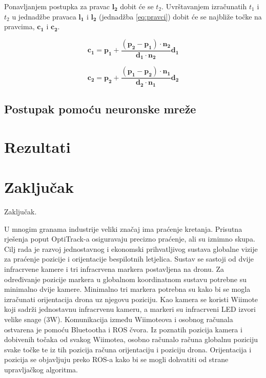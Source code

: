 \documentclass[times, utf8, diplomski]{fer}
\begin{document}
Ponavljanjem postupka za pravac $\bm{l_2}$ dobit će se $t_2$. Uvrštavanjem izračunatih $t_1$ i $t_2$ u jednadžbe pravaca $\bm{l_1}$ i $\bm{l_2}$ (jednadžba \ref{eq:pravci}) dobit će se najbliže točke na pravcima, $\bm{c_1}$ i $\bm{c_2}$.

\begin{equation}
\bm{c_1} = \bm{p_1} + \frac{(\bm{p_2} - \bm{p_1})\cdot \bm{n_2}}{\bm{d_1}\cdot\bm{n_2}}\bm{d_1}
\end{equation}

\begin{equation}
\bm{c_2} = \bm{p_2} + \frac{(\bm{p_1} - \bm{p_2})\cdot \bm{n_1}}{\bm{d_2}\cdot\bm{n_1}}\bm{d_2}
\end{equation}
 
\section{Postupak pomoću neuronske mreže}


\chapter{Rezultati}

\chapter{Zaključak}
Zaključak.




\begin{sazetak}
U mnogim granama industrije veliki značaj ima praćenje kretanja. Prisutna rješenja poput OptiTrack-a osiguravaju precizno praćenje, ali su iznimno skupa. Cilj rada je razvoj jednostavnog i ekonomski prihvatljivog sustava globalne vizije za praćenje pozicije i orijentacije bespilotnih letjelica. Sustav se sastoji od dvije infracrvene kamere i tri infracrvena markera postavljena na dronu. Za određivanje pozicije markera u globalnom koordinatnom sustavu potrebne su minimalno dvije kamere. Minimalno tri markera potrebna su kako bi se mogla izračunati orijentacija drona uz njegovu poziciju. Kao kamera se koristi Wiimote koji sadrži jednostavnu infracrvenu kameru, a markeri su infracrveni LED izvori velike snage (3W). Komunikacija između Wiimoteova i osobnog računala ostvarena je pomoću Bluetootha i ROS čvora. Iz poznatih pozicija kamera i dobivenih točaka od svakog Wiimotea, osobno računalo računa globalnu poziciju svake točke te iz tih pozicija računa orijentaciju i poziciju drona. Orijentacija i pozicija se objavljuju preko ROS-a kako bi se mogli dohvatiti od strane upravljačkog algoritma. 

\end{sazetak}
\newpage
\end{document}
